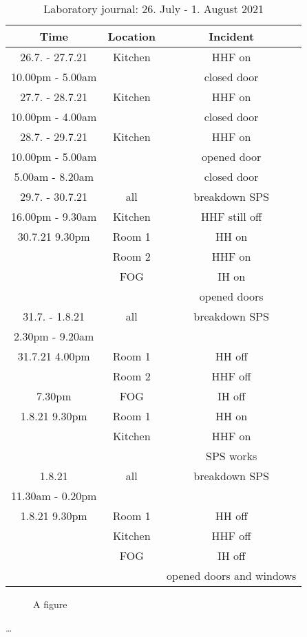\begin{table}[H]
    \centering
    \begin{tabular}{c|c|c}
        \textbf{Time} & \textbf{Location} & \textbf{Incident }\\
        \hline
        \hline
        26.7. - 27.7.21 & Kitchen & HHF on\\
        10.00pm - 5.00am & & closed door\\
        \hline
        27.7. - 28.7.21 & Kitchen & HHF on\\
        10.00pm - 4.00am & & closed door\\
        \hline
        28.7. - 29.7.21 & Kitchen & HHF on\\
        10.00pm - 5.00am & & opened door\\
        5.00am - 8.20am & & closed door\\
        \hline
        29.7. - 30.7.21 & all & breakdown SPS\\
        16.00pm - 9.30am & Kitchen & HHF still off\\
        \hline
        30.7.21 9.30pm & Room 1 & HH on\\
        & Room 2 & HHF on\\
        & FOG & IH on\\
        && opened doors\\
        \hline
        31.7. - 1.8.21 & all & breakdown SPS\\
        2.30pm - 9.20am &&\\
        \hline
        31.7.21 4.00pm & Room 1 & HH off\\
        & Room 2 & HHF off\\
        7.30pm & FOG & IH off\\
        \hline
        1.8.21 9.30pm & Room 1 & HH on\\
        & Kitchen & HHF on\\
       && SPS works\\
       \hline
        1.8.21 & all & breakdown SPS\\
        11.30am - 0.20pm &&\\
        \hline
        1.8.21 9.30pm & Room 1 & HH off\\
        & Kitchen & HHF off\\
        & FOG & IH off\\
        && opened doors and windows\\
    \end{tabular}
    \caption{Laboratory journal: 26. July - 1. August 2021}
    \label{tab:Experiment2}
\end{table}

\setcounter{figure}{0}
		
\begin{figure} [ht]
  \centering
  \caption{A figure}
  \label{fig:anotherfigure}
\end{figure}


\dots